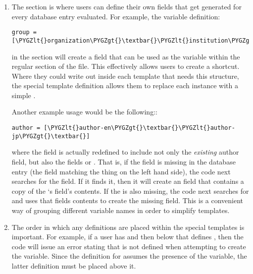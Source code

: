 \documentclass[letterpaper,10pt,english]{sphinxmanual}
\def\PYGZlt{\char`\<}
\def\PYGZgt{\char`\>}
\begin{document}
\begin{enumerate}
\item {} 
The  section is where users can define their own fields that get generated for every database entry evaluated. For example, the variable definition:

\begin{Verbatim}[commandchars=\\\{\}]
group = [\PYGZlt{}organization\PYGZgt{}\textbar{}\PYGZlt{}institution\PYGZgt{}\textbar{}\PYGZlt{}corporation\PYGZgt{}\textbar{}]
\end{Verbatim}

in the  section will create a  field that can be used as the variable  within the regular  section of the file. This effectively allows users to create a shortcut. Where they could write out  inside each template that needs this structure, the special template definition allows them to replace each instance with a simple .

Another example usage would be the following::

\begin{Verbatim}[commandchars=\\\{\}]
author = [\PYGZlt{}author-en\PYGZgt{}\textbar{}\PYGZlt{}author-jp\PYGZgt{}\textbar{}]
\end{Verbatim}

where the  field is actually redefined to include not only the \emph{existing} author field, but also the fields  or . That is, if the  field is missing in the database entry (the field matching the thing on the left hand side), the code next searches for the  field. If it finds it, then it will create an  field that contains a copy of the `s field's contents. If the  is also missing, the code next searches for  and uses that fields contents to create the missing  field. This is a convenient way of grouping different variable names in order to simplify templates.

\item {} 
The order in which any definitions are placed within the special templates is important. For example, if a user has  and then below that defines , then the code will issue an error stating that  is not defined when attempting to create the  variable. Since the definition for  assumes the presence of the  variable, the latter definition must be placed above it.

\end{enumerate}
\end{document}
